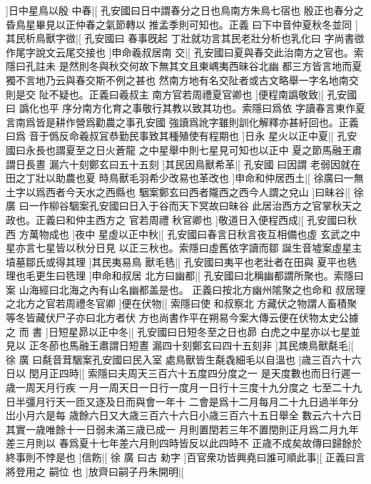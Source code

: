 ]日中星鳥以殷%
%
中春|[%
孔安國曰日中謂春分之日也鳥南方朱鳥七宿也%
殷正也春分之昏鳥星畢見以正仲春之氣節轉以%
%
推孟季則可知也。正義%
曰下中音仲夏秋冬並同%
]其民析鳥獸字㣲|[%
孔安國曰%
春事旣起%
%
丁壯就功言其民老壯分析也乳化曰%
字尚書㣲作尾字說文云尾交接也%
]申命羲叔居南%
%
交|[%
孔安國曰夏與春交此治南方之官也。索隱曰孔註未%
是然則冬與秋交何故下無其文且東嵎夷西昧谷北幽%
%
都三方皆言地而夏獨不言地乃云與春交斯不例之甚也%
然南方地有名交阯者或古文略舉一字名地南交則是交%
%
阯不疑也。正義曰羲叔主%
南方官若周禮夏官卿也%
]便程南譌敬致|[%
孔安國曰%
譌化也平%
%
序分南方化育之事敬行其教以致其功也。索隱曰爲依%
字讀春言東作夏言南爲皆是耕作營爲勸農之事孔安國%
%
強讀爲訛字雖則訓化解釋亦甚紆回也。正義曰爲%
音于僞反命羲叔冝恭勤民事致其種殖使有程期也%
]日永%
%
星火以正中夏|[%
孔安國曰永長也謂夏至之日火蒼龍%
之中星舉中則七星見可知也以正中%
%
夏之節馬融王肅謂日長晝%
漏六十刻鄭玄曰五十五刻%
]其民因鳥獸希革|[%
孔安國%
曰因謂%
%
老弱因就在田之丁壯以助農也夏%
時鳥獸毛羽希少改易也革改也%
]申命和仲居西土|[%
%
徐廣曰一無土字以爲西者今天水之西縣也%
駰案鄭玄曰西者隴西之西今人謂之兌山%
]曰昧谷|[%
徐%
廣%
%
曰一作柳谷駰案孔安國曰日入于谷而天下冥故曰昧谷%
此居治西方之官掌秋天之政也。正義曰和仲主西方之%
%
官若周禮%
秋官卿也%
]敬道日入便程西成|[%
孔安國曰秋西%
方萬物成也%
]夜中%
%
星虛以正中秋|[%
孔安國曰春言日秋言夜互相備也虛%
玄武之中星亦言七星皆以秋分日見%
%
以正三秋也。索隱曰虛舊依字讀而鄒%
誕生音墟案虛星主墳墓鄒氏或得其理%
]其民夷易鳥%
%
獸毛毨|[%
孔安國曰夷平也老壯者在田與%
夏平也毨理也毛更生曰毨理%
]申命和叔居%
%
北方曰幽都|[%
孔安國曰北稱幽都謂所聚也。索隱曰案%
山海經曰北海之內有山名幽都盖是也。%
%
正義曰按北方幽州隂聚之也命和%
叔居理之北方之官若周禮冬官卿%
]便在伏物|[%
索隱曰使%
和叔察北%
%
方藏伏之物謂人畜積聚等冬皆藏伏尸子亦曰北方者伏%
方也尚書作平在朔易今案大傳云便在伏物太史公據之%
%
而%
書%
]日短星昴以正中冬|[%
孔安國曰日短冬至之日也昴%
白虎之中星亦以七星並見以%
%
正冬莭也馬融王肅謂日短晝%
漏四十刻鄭玄曰四十五刻非%
]其民燠鳥獸氄毛|[%
徐%
廣%
%
曰氄音茸駰案孔安國曰民入室%
處鳥獸皆生氄毳細毛以自溫也%
]歳三百六十六日以%
%
閏月正四時|[%
索隱曰夫周天三百六十五度四分度之一%
是天度數也而日行遲一歳一周天月行疾%
%
一月一周天日一日行一度月一日行十三度十九分度之%
七至二十九日半彊月行天一匝又逐及日而與會一年十%
%
二會是爲十二月每月二十九日過半年分岀小月六是每%
歳餘六日又大歳三百六十六日小歳三百六十五日舉全%
%
數云六十六日其實一歳唯餘十一日弱未滿三歳已成一%
月則置閏若三年不置閏則正月爲二月九年差三月則以%
%
春爲夏十七年差六月則四時皆反以此四時不%
正歳不成矣故傳曰歸餘於終事則不悖是也%
]信飭|[%
徐%
廣%
%
曰古%
勑字%
]百官衆功皆興堯曰誰可順此事|[%
正義曰言%
將登用之%
%
嗣位%
也%
]放齊曰嗣子丹朱開明|[%
